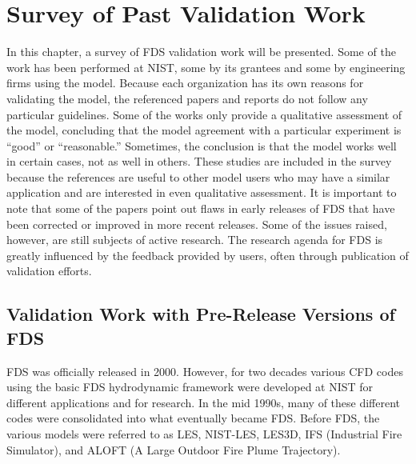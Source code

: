 \chapter{Survey of Past Validation Work}

\label{Survey_Chapter}

In this  chapter, a survey of  FDS validation work  will be presented. Some of the work has been  performed at NIST, some by its grantees and some by
engineering firms using the model.  Because each organization has its  own reasons for  validating the model, the  referenced papers and reports do
not follow any particular guidelines. Some of the works only provide  a qualitative assessment  of the model,  concluding that the  model  agreement
with  a  particular  experiment  is ``good''  or ``reasonable.'' Sometimes, the conclusion is that the model works well in certain cases, not as well
in others. These studies are included in the survey because the references  are useful to other model users who may have a similar application  and
are interested in even qualitative assessment. It is important to note  that some of the papers point out flaws in early releases of FDS that have
been corrected or improved in more recent  releases. Some of  the issues raised, however,  are still subjects of  active research. The  research
agenda for FDS  is greatly influenced  by   the  feedback   provided  by  users,   often  through publication of validation efforts.


\section{Validation Work with Pre-Release Versions of FDS}

FDS was officially released in  2000. However, for two decades various CFD codes using the basic FDS hydrodynamic framework were developed at NIST
for  different applications and  for research. In the  mid 1990s, many of  these different codes were consolidated  into what eventually became FDS.
Before FDS, the various  models were referred  to as LES, NIST-LES, LES3D,  IFS (Industrial Fire Simulator), and  ALOFT (A Large Outdoor Fire Plume
Trajectory).

